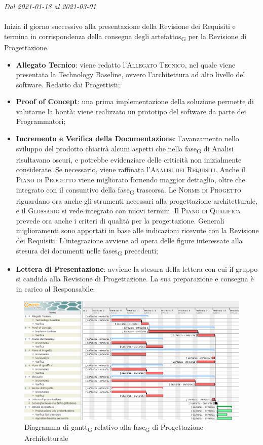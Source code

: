 \textit{Dal 2021-01-18 al 2021-03-01}
\\\\
Inizia il giorno successivo alla presentazione della Revisione dei Requisiti e termina in corrispondenza della consegna degli \glspl{artefatto}\textsubscript{G} per la Revisione di Progettazione.
\begin{itemize}
	\item \textbf{Allegato Tecnico}: viene redatto l'\textsc{Allegato Tecnico}, nel quale viene presentata la Technology Baseline, ovvero l'architettura ad alto livello del software. Redatto dai Progettisti;
	\item \textbf{Proof of Concept}: una prima implementazione della soluzione permette di valutarne la bontà: viene realizzato un prototipo del software da parte dei Programmatori;
	\item \textbf{Incremento e Verifica della Documentazione}: l'avanzamento nello sviluppo del prodotto chiarirà alcuni aspetti che nella \gls{fase}\textsubscript{G} di Analisi risultavano oscuri, e potrebbe evidenziare delle criticità non inizialmente considerate. Se necessario, viene raffinata l'\textsc{Analisi dei Requisiti}. Anche il \textsc{Piano di Progetto} viene migliorato fornendo maggior dettaglio, oltre che integrato con il consuntivo della \gls{fase}\textsubscript{G} trascorsa. Le \textsc{Norme di Progetto} riguardano ora anche gli strumenti necessari alla progettazione architetturale, e il \textsc{Glossario} si vede integrato con nuovi termini. Il \textsc{Piano di Qualifica} prevede ora anche i criteri di qualità per la progettazione. Generali miglioramenti sono apportati in base alle indicazioni ricevute con la Revisione dei Requisiti. L'integrazione avviene ad opera delle figure interessate alla stesura dei documenti nelle \glspl{fase}\textsubscript{G} precedenti;
	\item \textbf{Lettera di Presentazione}: avviene la stesura della lettera con cui il gruppo si candida alla Revisione di Progettazione. La sua preparazione e consegna è in carico al Responsabile.
\end{itemize}

\begin{figure}[H]
	\centering
	\includegraphics[scale=0.50]{res/images/03_gantt_progettazione.png}
	\caption{Diagramma di \gls{gantt}\textsubscript{G} relativo alla \gls{fase}\textsubscript{G} di Progettazione Architetturale}
\end{figure}

